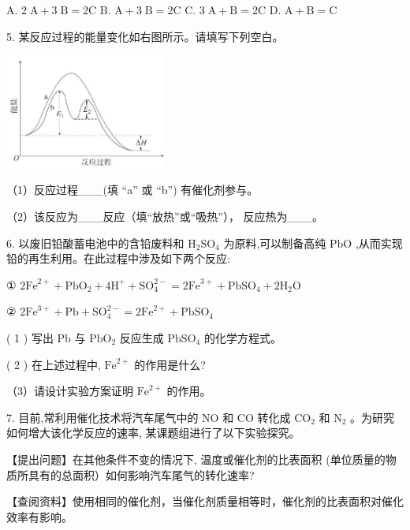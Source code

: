 \documentclass[10pt]{article}
\begin{document}
A. \(2\mathrm{\;A} + 3\mathrm{\;B} = 2\mathrm{C}\) B. \(\mathrm{A} + 3\mathrm{\;B} = 2\mathrm{C}\) C. \(3\mathrm{\;A} + \mathrm{B} = 2\mathrm{C}\) D. \(\mathrm{A} + \mathrm{B} = \mathrm{C}\)

5. 某反应过程的能量变化如右图所示。请填写下列空白。

\begin{center}
\includegraphics[max width=0.4\textwidth]{images/0190da9d-8bfd-732f-bc2c-0b21d0f13b91_36_335058.jpg}
\end{center}

（1）反应过程\_\_\_(填 “a” 或 “b”) 有催化剂参与。

（2）该反应为\_\_\_反应（填“放热”或“吸热”）， 反应热为\_\_\_。

6. 以废旧铅酸蓄电池中的含铅废料和 \({\mathrm{H}}_{2}{\mathrm{{SO}}}_{4}\) 为原料,可以制备高纯 \(\mathrm{{PbO}}\) ,从而实现铅的再生利用。在此过程中涉及如下两个反应:

① \(2{\mathrm{{Fe}}}^{2 + } + {\mathrm{{PbO}}}_{2} + 4{\mathrm{H}}^{ + } + {\mathrm{{SO}}}_{4}^{2 - } = 2{\mathrm{{Fe}}}^{3 + } + {\mathrm{{PbSO}}}_{4} + 2{\mathrm{H}}_{2}\mathrm{O}\)

② \(2{\mathrm{{Fe}}}^{3 + } + \mathrm{{Pb}} + {\mathrm{{SO}}}_{4}^{2 - } = 2{\mathrm{{Fe}}}^{2 + } + {\mathrm{{PbSO}}}_{4}\)

( 1 ) 写出 \(\mathrm{{Pb}}\) 与 \({\mathrm{{PbO}}}_{2}\) 反应生成 \({\mathrm{{PbSO}}}_{4}\) 的化学方程式。

( 2 ) 在上述过程中, \({\mathrm{{Fe}}}^{2 + }\) 的作用是什么?

（3）请设计实验方案证明 \({\mathrm{{Fe}}}^{2 + }\) 的作用。

7. 目前,常利用催化技术将汽车尾气中的 \(\mathrm{{NO}}\) 和 \(\mathrm{{CO}}\) 转化成 \({\mathrm{{CO}}}_{2}\) 和 \({\mathrm{N}}_{2}\) 。为研究如何增大该化学反应的速率, 某课题组进行了以下实验探究。

【提出问题】在其他条件不变的情况下, 温度或催化剂的比表面积 (单位质量的物质所具有的总面积）如何影响汽车尾气的转化速率?

【查阅资料】使用相同的催化剂，当催化剂质量相等时，催化剂的比表面积对催化效率有影响。
\end{document}
